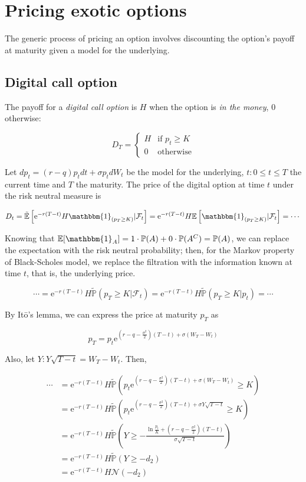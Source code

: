 \documentclass[oneside,titlepage,headinclude,12pt,a4paper,BCOR5mm,footinclude]{book}
\theoremstyle{defn}
\newcommand{\eexp}{\mathrm{e}}
\begin{document}
\section{Pricing exotic options}

The  generic process  of pricing  an  option involves  discounting the  option's
payoff at maturity given a model for the underlying.

\subsection{Digital call option}

The  payoff  for a  \textit{digital  call  option} is  $H$  when  the option  is
\textit{in the money}, $0$ otherwise:

\[
  D_T = \left\{ \begin{array}{cl}
      H & \text{if } p_t \geq K \\
      0 & \text{otherwise}
    \end{array}
\]

Let $dp_t  = (r-q)p_tdt  + \sigma  p_t dW_t$  be the  model for  the underlying,
$t:0\leq  t\leq T$  the current  time and  $T$ the  maturity. The  price of  the
digital option at time $t$ under the risk neutral measure is

\[
  D_t = \mathbb{\tilde E}\left[ \eexp^{-r(T-t)}H \mathbbm{1}_{(p_T \geq K)} |\mathcal{F}_t \right]
      = \eexp^{-r(T-t)}H \mathbb{E}\left[ \mathbbm{1}_{(p_T \geq K)} | \mathcal{F}_t\right]
      = \cdots
\]

Knowing  that  $\mathbb{E}[\mathbbm{1}_A] =  1  \cdot  \mathbb{P}(A) +  0  \cdot
\mathbb{P}(A^C) = \mathbb{P}(A)$,  we can replace the expectation  with the risk
neutral probability;  then, for the  Markov property of Black-Scholes  model, we
replace the  filtration with  the information  known at time  $t$, that  is, the
underlying price.

\[
  \cdots = \eexp^{-r(T-t)}H \mathbb{\tilde P}(p_T \geq K | \mathcal{F}_t)
        = \eexp^{-r(T-t)}H \mathbb{\tilde P}(p_T \geq K | p_t) = \cdots
\]

By It\=o's lemma, we can express the price at maturity $p_T$ as

\[
  p_T = p_t \eexp^{\left(r-q-\frac{\sigma^2}{2}\right)(T-t) + \sigma(W_T-W_t)}
\]

Also, let $Y : Y\sqrt{T-t} = W_T-W_t$. Then,

\begin{align*}
  \cdots &= \eexp^{-r(T-t)}H \mathbb{\tilde P}\left( p_t \eexp^{\left(r-q-\frac{\sigma^2}{2}\right)(T-t) +\sigma(W_T-W_t)} \geq K\right)
  \\&= \eexp^{-r(T-t)}H \mathbb{\tilde P}\left( p_t \eexp^{\left(r-q-\frac{\sigma^2}{2}\right)(T-t) +\sigma Y\sqrt{T-t}} \geq K\right)
  \\&= \eexp^{-r(T-t)}H \mathbb{\tilde P}\left(Y \geq -\frac{\ln\frac{p_t}{K} + \left(r-q-\frac{\sigma^2}{2}\right)(T-t)}{\sigma\sqrt{T-t}}\right)
  \\&= \eexp^{-r(T-t)}H \mathbb{\tilde P}(Y \geq -d_2) 
  \\&= \eexp^{-r(T-t)}H \mathcal{N}(-d_2)
\end{align*}
\end{document}
